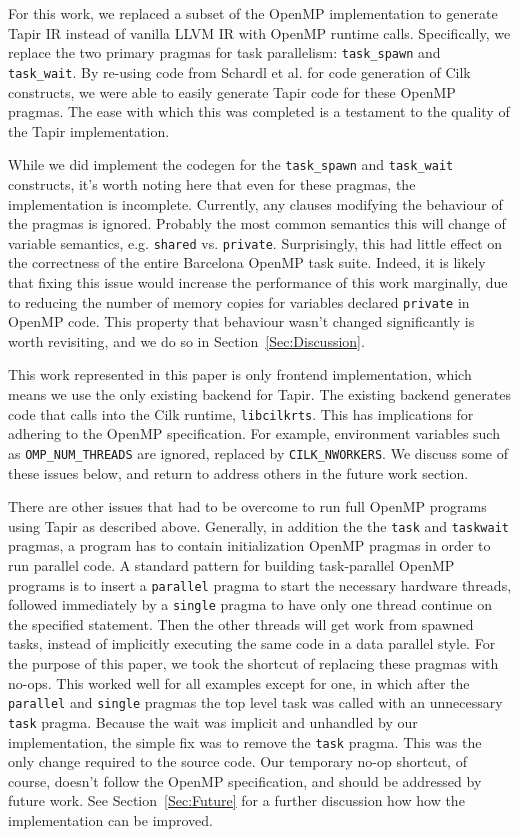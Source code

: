 \documentclass[sigconf]{acmart}
\begin{document}
For this work, we replaced a subset of the OpenMP implementation to generate
Tapir IR instead of vanilla LLVM IR with OpenMP runtime calls. Specifically, we
replace the two primary pragmas for task parallelism: \texttt{task\_spawn} and
\texttt{task\_wait}. By re-using code from Schardl et al. for code generation
of Cilk constructs, we were able to easily generate Tapir code for these OpenMP
pragmas. The ease with which this was completed is a testament to the quality of
the Tapir implementation. 

While we did implement the codegen for the \texttt{task\_spawn} and
\texttt{task\_wait} constructs, it's worth noting here that even for these
pragmas, the implementation is incomplete. Currently, any clauses modifying the
behaviour of the pragmas is ignored. Probably the most common semantics this
will change of variable semantics, e.g. \texttt{shared} vs. \texttt{private}.
Surprisingly, this had little effect on the correctness of the entire Barcelona
OpenMP task suite. Indeed, it is likely that fixing this issue would increase
the performance of this work marginally, due to reducing the number of memory
copies for variables declared \texttt{private} in OpenMP code. This property
that behaviour wasn't changed significantly is worth revisiting, and we do so
in Section~\ref{Sec:Discussion}. 

This work represented in this paper is only frontend implementation, which
means we use the only existing backend for Tapir. The existing backend
generates code that calls into the Cilk runtime, \texttt{libcilkrts}. This has
implications for adhering to the OpenMP specification. For example, environment
variables such as \texttt{OMP\_NUM\_THREADS} are ignored, replaced by
\texttt{CILK\_NWORKERS}.  We discuss some of these issues below, and return to
address others in the future work section. 

There are other issues that had to be overcome to run full OpenMP programs
using Tapir as described above. Generally, in addition the the \texttt{task} 
and \texttt{taskwait} pragmas, a program has to contain initialization OpenMP
pragmas in order to run parallel code. A standard pattern for building
task-parallel OpenMP programs is to insert a \texttt{parallel} pragma to start
the necessary hardware threads, followed immediately by a \texttt{single}
pragma to have only one thread continue on the specified statement. Then the
other threads will get work from spawned tasks, instead of implicitly executing
the same code in a data parallel style. For the purpose of this paper, we took
the shortcut of replacing these pragmas with no-ops. This worked well for all
examples except for one, in which after the \texttt{parallel} and
\texttt{single} pragmas the top level task was called with an unnecessary
\texttt{task} pragma.  Because the wait was implicit and unhandled by our
implementation, the simple fix was to remove the \texttt{task} pragma. This was
the only change required to the source code. Our temporary no-op shortcut, of
course, doesn't follow the OpenMP specification, and should be addressed by
future work. See Section~\ref{Sec:Future} for a further discussion how how the 
implementation can be improved.
\end{document}
